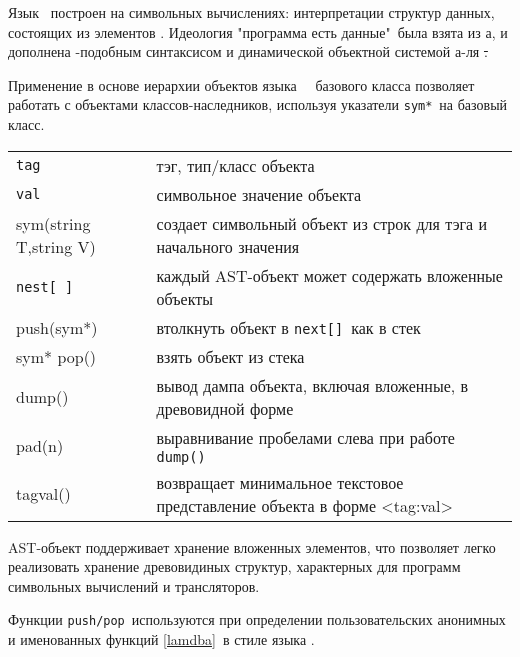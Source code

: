\label{bisyntax}\secdown



\label{symbol}

Язык \bi\ построен на символьных вычислениях: интерпретации структур данных,
состоящих из элементов .
Идеология "программа есть данные"\ была взята из \lisp а, и дополнена
\py-подобным синтаксисом и динамической объектной системой а-ля \st.

\begin{framed}
Применение в основе иерархии объектов языка \bi\ \ базового
класса позволяет работать с объектами классов-наследников, используя указатели
\verb|sym*|\ на базовый класс. 
\end{framed}


\begin{tabular}{l l}
\verb|tag| & тэг, тип/класс объекта \\
\verb|val| & символьное значение объекта \\
sym(string T,string V) & создает символьный объект из строк для тэга
 и начального значения \\
\hline
\verb|nest[ ]| & каждый AST-объект может содержать вложенные объекты \\
push(sym*) & втолкнуть объект в \verb|next[]|\ как в стек \\
sym* pop() & взять объект из стека \\ 
\hline
dump() & вывод дампа объекта, включая вложенные, в древовидной форме \\
pad(n) & выравнивание пробелами слева при работе \verb|dump()| \\
tagval() & возвращает минимальное текстовое представление 
объекта в форме <tag:val> \\
\end{tabular}

\bigskip
AST-объект поддерживает хранение вложенных элементов, что позволяет легко
реализовать хранение древовидиных структур, характерных для программ символьных
вычислений и трансляторов. 

Функции \verb|push/pop|\ используются при определении пользовательских 
анонимных и именованных функций \ref{lamdba}\ в стиле языка \forth.  


\secdown


